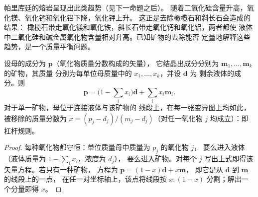帕里库廷的熔岩呈现出此类趋势（见下一命题之后）。
随着二氧化硅含量升高，氧化镁、氧化钙和氧化铝下降，氧化钾上升。
这正是去除橄榄石和斜长石会造成的结果：
橄榄石带走氧化镁和氧化铁，斜长石带走氧化钙和氧化铝，两者都使
液体中二氧化硅和碱金属氧化物含量相对升高。已知矿物的去除能否
定量地解释这些趋势，是一个质量平衡问题。

\begin{proposition}[晶体移除的质量平衡]\label{prop:b2:magmatic-differentiation:lever}
设母的成分为 $\mathbf p$（氧化物质量分数构成的矢量），
它结晶出成分分别为 $\mathbf m_1, \dots, \mathbf m_k$ 的矿物，其质量
分别为每单位母质量中的 $x_1, \dots, x_k$，并设 $\mathbf d$ 为
剩余液体的成分。则
\[
\mathbf p = \Big(1 - \sum_i x_i\Big)\mathbf d + \sum_i x_i \mathbf m_i .
\]
对于单一矿物，母位于连接液体与该矿物的
线段上，在每一张变异图上均如此，被移除的质量分数为
$x = (p_j - d_j)/(m_j - d_j)$（对任一氧化物 $j$ 均成立）：即杠杆规则。
\end{proposition}

\begin{proof}
每种氧化物都守恒：单位质量母中质量为 $p_j$ 的氧化物 $j$，
要么进入液体（液体质量为 $1 - \sum_i x_i$，浓度为 $d_j$），
要么进入矿物。对每个 $j$ 写出上式即得该矢量方程。若只有一种矿物，
方程为 $\mathbf p = (1-x)\mathbf d + x\mathbf m$，
即它是从 $\mathbf d$ 到 $\mathbf m$ 的线段上的一点，
在任一对坐标轴上，该点将线段按 $x : (1-x)$ 分割；解出一个分量即得 $x$。
\end{proof}

